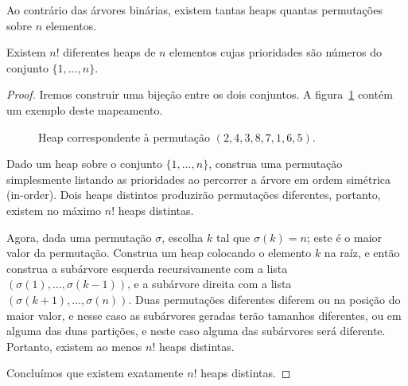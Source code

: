 Ao contrário das árvores binárias,
existem tantas heaps quantas permutações sobre $n$ elementos.

\begin{proposition}
    Existem $n!$ diferentes heaps de $n$ elementos
    cujas prioridades são números do conjunto $\{1, \dots, n\}$.
\end{proposition}

\begin{proof}
    Iremos construir uma bijeção entre os dois conjuntos.
    A figura~\ref{fig:heap-permutation} contém um exemplo deste mapeamento.

    \begin{figure}[h]
        \centering
        \caption{Heap correspondente à permutação $(2, 4, 3, 8, 7, 1, 6, 5)$.}
        \label{fig:heap-permutation}
    \end{figure}

    Dado um heap sobre o conjunto $\{1, \dots, n\}$,
    construa uma permutação
    simplesmente listando as prioridades ao percorrer a árvore em ordem simétrica
    (in-order).
    Dois heaps distintos produzirão permutações diferentes,
    portanto, existem no máximo $n!$ heaps distintas.

    Agora, dada uma permutação $\sigma$,
    escolha $k$ tal que $\sigma(k) = n$; este é o maior valor da permutação.
    Construa um heap colocando o elemento $k$ na raíz,
    e então construa a subárvore esquerda recursivamente com a lista
    $(\sigma(1), \dots, \sigma(k-1))$,
    e a subárvore direita com a lista $(\sigma(k+1), \dots, \sigma(n))$.
    Duas permutações diferentes diferem ou na posição do maior valor,
    e nesse caso as subárvores geradas terão tamanhos diferentes,
    ou em alguma das duas partições,
    e neste caso alguma das subárvores será diferente.
    Portanto, existem ao menos $n!$ heaps distintas.

    Concluímos que existem exatamente $n!$ heaps distintas.
\end{proof}
